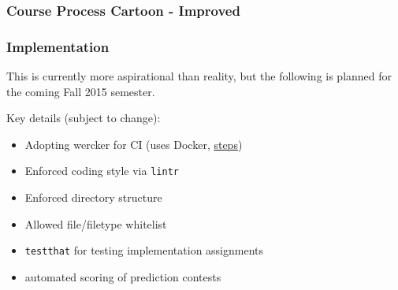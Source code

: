 \documentclass[12pt]{beamer}
\begin{document}
\begin{frame}
\frametitle{Course Process Cartoon - Improved}

\vspace{-7mm}

\begin{center}
\end{center}

\end{frame}


\begin{frame}[fragile]
\frametitle{Implementation}

This is currently more aspirational than reality, but the following is planned for the coming Fall 2015 semester.

\vspace{3mm}

Key details (subject to change):

\begin{itemize}
\item Adopting wercker for CI (uses Docker, \href{https://app.wercker.com/#buildstep/55883b8aade909cb4a0014b7}{steps})
\item Enforced coding style via \texttt{lintr}
\item Enforced directory structure
\item Allowed file/filetype whitelist
\item \texttt{testthat} for testing implementation assignments
\item automated scoring of prediction contests
\end{itemize}

\end{frame}
\end{document}
